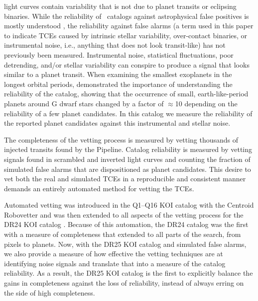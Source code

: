 \Kepler{} light curves contain variability that is not due to planet transits or eclipsing binaries. While the reliability of \Kepler\ catalogs against astrophysical false positives is mostly understood \citep[see e.g.][]{Morton2016}, the reliability against false alarms (a term used in this paper to indicate TCEs caused by intrinsic stellar variability, over-contact binaries, or instrumental noise, i.e., anything that does not look transit-like) has not previously been measured. Instrumental noise, statistical fluctuations, poor detrending, and/or stellar variability can conspire to produce a signal that looks similar to a planet transit. When examining the smallest exoplanets in the longest orbital periods, \citet{Burke2015} demonstrated the importance of understanding the reliability of the catalog, showing that the occurrence of small, earth-like-period planets around G dwarf stars changed by a factor of $\approx$10 depending on the reliability of a few planet candidates.  In this catalog we measure the reliability of the reported planet candidates against this instrumental and stellar noise.  

The completeness of the vetting process is measured by vetting thousands of injected transits found by the \Kepler{} Pipeline. Catalog reliability is measured by vetting signals found in scrambled and inverted \Kepler{} light curves and counting the fraction of simulated false alarms that are dispositioned as planet candidates. This desire to vet both the real and simulated TCEs in a reproducible and consistent manner demands an entirely automated method for vetting the TCEs.  

Automated vetting was introduced in the Q1--Q16 KOI catalog \citep{Mullally2015cat} with the Centroid Robovetter and was then extended to all aspects of the vetting process for the DR24 KOI catalog \citep{Coughlin2016}. Because of this automation, the DR24 catalog was the first with a measure of completeness that extended to all parts of the search, from pixels to planets.  Now, with the DR25 KOI catalog and simulated false alarms, we also provide a measure of how effective the vetting techniques are at identifying noise signals and translate that into a measure of the catalog reliability. As a result, the DR25 KOI catalog is the first to explicitly balance the gains in completeness against the loss of reliability, instead of always erring on the side of high completeness. 



